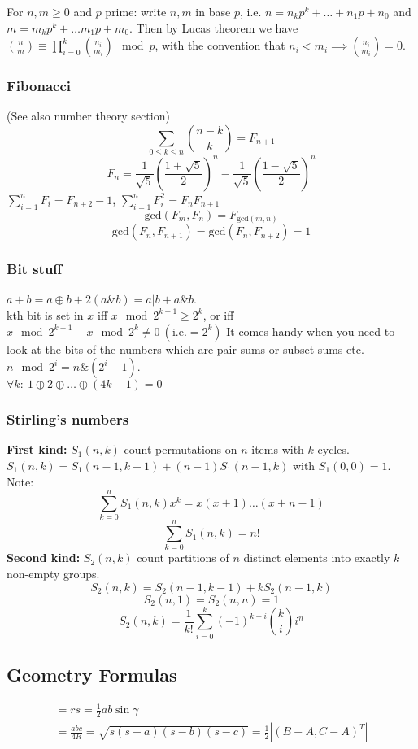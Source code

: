 \documentclass[
	a4paper,
	landscape,
	10pt,
]{article}
\begin{document}
\begin{multicols}{3}
		For $n, m \geq 0$ and $p$ prime: write $n, m$ in base $p$, i.e.
		$n = n_k p^k + \dots + n_1 p + n_0$ and $m = m_k p^k + \dots m_1 p + m_0$. Then
		by Lucas theorem we have $\binom{n}{m} \equiv \prod_{i=0}^k \binom{n_i}{m_i}
		\mod p$, with the convention that $n_i < m_i \implies \binom{n_i}{m_i} =0$.

		\subsubsection*{Fibonacci} (See also number theory section) \\
 		$$\sum_{0 \leq k \leq n} \binom{n-k}{k} = F_{n+1}$$ 
		$$F_n = \frac{1}{\sqrt{5}} \left(\frac{1+\sqrt{5}}{2}\right)^n - \frac{1}{\sqrt{5}}\left(\frac{1-\sqrt{5}}{2}\right)^n$$
		$\sum_{i=1}^{n} {F_i} = F_{n+2}-1$, $\sum_{i=1}^{n} {F_i^2} = F_{n}F_{n+1}$
		$$\text{gcd}(F_m, F_n) = F_{\text{gcd}(m, n)}$$
		$$\text{gcd}(F_n, F_{n+1}) = \text{gcd}(F_n, F_{n+2}) = 1$$

		\subsubsection*{Bit stuff} $a + b = a \oplus b + 2(a\&b) = a | b + a\&b$. \\
		kth bit is set in $x$ iff $x \mod 2^{k-1} \geq 2^k$, or iff $x \mod 2^{k-1}  - x \mod 2^k \neq 0~(\text{i.e.} = 2^k)$ It comes handy when you need to look at the bits of the numbers which are pair sums or subset sums etc. \\
		$n \mod 2^i = n\&(2^i-1)$. \\
		$\forall k:~ 1 \oplus 2 \oplus \hdots \oplus (4k-1) = 0$

		\subsubsection*{Stirling's numbers} \textbf{First kind:} $S_1(n, k)$ count permutations on $n$ items
		with $k$ cycles. $S_1(n, k) = S_1(n-1, k-1) + (n-1)S_1(n-1, k)$ with
		$S_1(0, 0) = 1$. Note:
		$$\sum_{k=0}^n S_1(n, k)x^k = x(x+1)\dots(x+n-1)$$
		$$ \sum_{k=0}^n S_1(n, k) = n! $$
		\textbf{Second kind:} $S_2(n, k)$ count partitions of $n$
		distinct elements into exactly $k$ non-empty groups.
		$$ S_2(n, k) = S_2(n-1, k-1) + kS_2(n-1, k)$$
		$$S_2(n, 1) = S_2(n, n) = 1$$
		$$ S_2(n, k) = \frac{1}{k!}\sum_{i=0}^k (-1)^{k-i}\binom{k}{i}i^n $$

		\subsection{Geometry Formulas}
		\begin{gather*}
			[ABC]
			= rs
			= \frac 12 ab\sin\gamma \\
			= \frac{abc}{4R}
			= \sqrt{s(s-a)(s-b)(s-c)}
			= \frac 12\left| (B-A, C-A)^T \right|
		\end{gather*}


\end{multicols}
\end{document}
